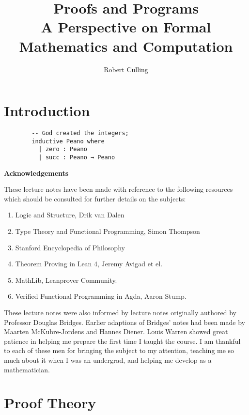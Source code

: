 \documentclass{book}
\title{Proofs and Programs \\
        \normalsize{A Perspective on Formal Mathematics and Computation}}
\author{Robert Culling}
\begin{document}
\maketitle

\tableofcontents

\chapter{Introduction}

    \begin{lstlisting}
        -- God created the integers;
        inductive Peano where
          | zero : Peano
          | succ : Peano → Peano
    \end{lstlisting} 
        
    \newpage
    {\bf Acknowledgements} 
    
    These lecture notes have been made with reference to the following resources which should be consulted for further details on the subjects: 

        \begin{enumerate}
            \item Logic and Structure, Drik van Dalen \cite{vDalen}
            \item Type Theory and Functional Programming, Simon Thompson \cite{thompson}
            \item Stanford Encyclopedia of Philosophy
            \item Theorem Proving in Lean 4, Jeremy Avigad et el.
            \item MathLib, Leanprover Community. 
            \item Verified Functional Programming in Agda, Aaron Stump.
        \end{enumerate}    
    
    These lecture notes were also informed by lecture notes originally authored by Professor Douglas Bridges. Earlier adaptions of Bridges' notes had been made by Maarten McKubre-Jordens and Hannes Diener. Louis Warren showed great patience in helping me prepare the first time I taught the course. I am thankful to each of these men for bringing the subject to my attention, teaching me so much about it when I was an undergrad, and helping me develop as a mathematician. 

\chapter{Proof Theory}
\end{document}
